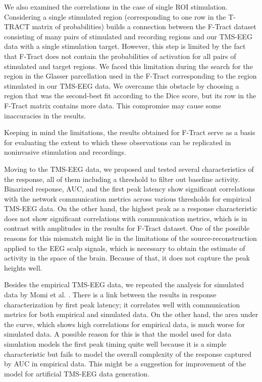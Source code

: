 We also examined the correlations in the case of single ROI stimulation. Considering a single stimulated region (corresponding to one row in the T-TRACT matrix of probabilities) builds a connection between the F-Tract dataset consisting of many pairs of stimulated and recording regions and our TMS-EEG data with a single stimulation target. However, this step is limited by the fact that F-Tract does not contain the probabilities of activation for all pairs of stimulated and target regions. We faced this limitation during the search for the region in the Glasser parcellation used in the F-Tract corresponding to the region stimulated in our TMS-EEG data. We overcame this obstacle by choosing a region that was the second-best fit according to the Dice score, but its row in the F-Tract matrix contains more data. This compromise may cause some inaccuracies in the results.

Keeping in mind the limitations, the results obtained for F-Tract serve as a basis for evaluating the extent to which these observations can be replicated in noninvasive stimulation and recordings. 

Moving to the TMS-EEG data, we proposed and tested several characteristics of the response, all of them including a threshold to filter out baseline activity. Binarized response, AUC, and the first peak latency show significant correlations with the network communication metrics across various thresholds for empirical TMS-EEG data. On the other hand, the highest peak as a response characteristic does not show significant correlations with communication metrics, which is in contrast with amplitudes in the results for F-Tract dataset. One of the possible reasons for this mismatch might lie in the limitations of the source-reconstruction applied to the EEG scalp signals, which is necessary to obtain the estimate of activity in the space of the brain. Because of that, it does not capture the peak heights well.

Besides the empirical TMS-EEG data, we repeated the analysis for simulated data by Momi et al. \cite{momi_tms-evoked_2023}. There is a link between the results in response characterization by first peak latency; it correlates well with communication metrics for both empirical and simulated data. On the other hand, the area under the curve, which shows high correlations for empirical data, is much worse for simulated data. A possible reason for this is that the model used for data simulation models the first peak timing quite well because it is a simple characteristic but fails to model the overall complexity of the response captured by AUC in empirical data. This might be a suggestion for improvement of the model for artificial TMS-EEG data generation.


